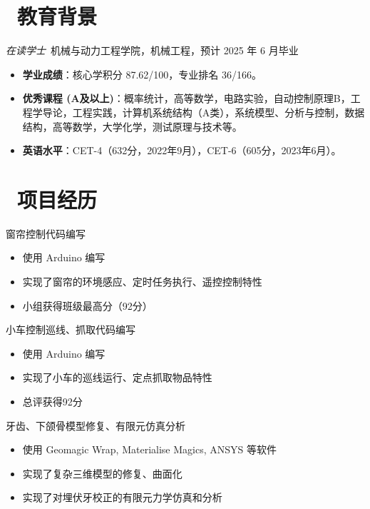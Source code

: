 \documentclass{resume}
\begin{document}


 
\section{\faGraduationCap\  教育背景}
\textit{在读学士}\ 机械与动力工程学院，机械工程，预计 2025 年 6 月毕业
\begin{itemize}
  \item \textbf{学业成绩}：核心学积分 87.62/100，专业排名 36/166。
  \item \textbf{优秀课程 (A及以上)}：概率统计，高等数学\uppercase\expandafter{}，电路实验，自动控制原理B，工程学导论，工程实践，计算机系统结构（A类），系统模型、分析与控制，数据结构，高等数学\uppercase\expandafter{}，大学化学，测试原理与技术等。
  \item \textbf{英语水平}：CET-4（632分，2022年9月），CET-6（605分，2023年6月）。
\end{itemize}


\section{\faUsers\ 项目经历}
窗帘控制代码编写
\begin{itemize}
  \item 使用 Arduino 编写
  \item 实现了窗帘的环境感应、定时任务执行、遥控控制特性
  \item 小组获得班级最高分（92分）
\end{itemize}

小车控制巡线、抓取代码编写
\begin{itemize}
  \item 使用 Arduino 编写
  \item 实现了小车的巡线运行、定点抓取物品特性
  \item 总评获得92分
\end{itemize}

牙齿、下颌骨模型修复、有限元仿真分析
\begin{itemize}
  \item 使用 Geomagic Wrap, Materialise Magics, ANSYS 等软件
  \item 实现了复杂三维模型的修复、曲面化
  \item 实现了对埋伏牙校正的有限元力学仿真和分析
\end{itemize}
\end{document}
